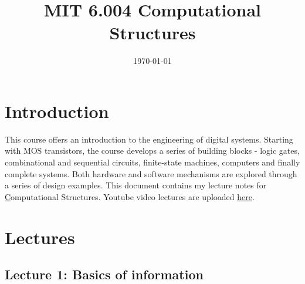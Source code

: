 \documentclass[a4paper,twoside]{article}
\numberwithin{equation}{section}
\begin{document}
%



\title{MIT 6.004 Computational Structures} \author{} \date{\today} \maketitle \thispagestyle{empty}



\setcounter{page}{1}

\tableofcontents
\newpage
\setcounter{section}{0}
\setcounter{page}{1}
\section{Introduction}
\label{Introduction}
This course offers an introduction to the engineering of digital systems. Starting with MOS transistors,
the course develops a series of building blocks - logic gates, combinational and sequential circuits, finite-state machines, computers and finally complete systems. Both hardware and software mechanisms are explored through a series of design examples. This document contains my lecture notes for \href{https://ocw.mit.edu/courses/6-004-computation-structures-spring-2017/pages/syllabus/} Computational Structures. Youtube video lectures are uploaded \href{https://www.youtube.com/watch?v=R0tFDXBZvKI&list=PLUl4u3cNGP62WVs95MNq3dQBqY2vGOtQ2&ab_channel=MITOpenCourseWare}{here}.

\section{Lectures}
\subsection{Lecture 1: Basics of information}
\label{Lecture 1}
\end{document}
